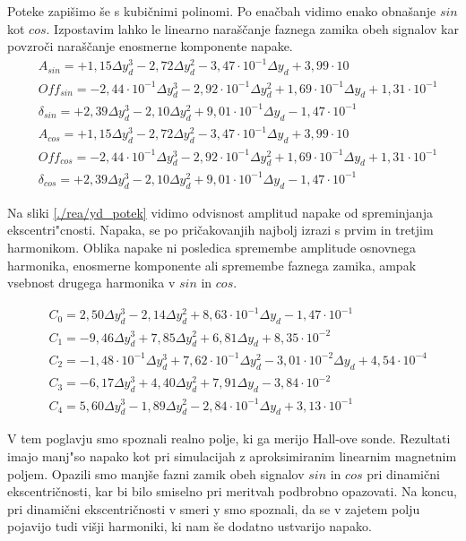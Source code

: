 Poteke zapišimo še s kubičnimi polinomi. Po enačbah vidimo enako obnašanje $sin$ kot $cos$. Izpostavim lahko le linearno naraščanje faznega zamika obeh signalov kar povzroči naraščanje enosmerne komponente napake.
\begin{eqnarray}
&A_{sin} = +1,15\Delta y_d^3-2,72\Delta y_d^2-3,47\cdot 10^{-1}\Delta y_d+3,99\cdot 10\\     
&Off_{sin} = -2,44\cdot 10^{-1}\Delta y_d^3-2,92\cdot 10^{-1}\Delta y_d^2+1,69\cdot 10^{-1}\Delta y_d+1,31\cdot 10^{-1}\\   
&\delta_{sin} = +2,39\Delta y_d^3-2,10\Delta y_d^2+9,01\cdot 10^{-1}\Delta y_d-1,47\cdot 10^{-1}\\
&A_{cos} = +1,15\Delta y_d^3-2,72\Delta y_d^2-3,47\cdot 10^{-1}\Delta y_d+3,99\cdot 10\\     
&Off_{cos} = -2,44\cdot 10^{-1}\Delta y_d^3-2,92\cdot 10^{-1}\Delta y_d^2+1,69\cdot 10^{-1}\Delta y_d+1,31\cdot 10^{-1}\\   
&\delta_{cos} = +2,39\Delta y_d^3-2,10\Delta y_d^2+9,01\cdot 10^{-1}\Delta y_d-1,47\cdot 10^{-1} 
\end{eqnarray}

Na sliki \ref{./rea/yd_potek} vidimo odvisnost amplitud napake od spreminjanja ekscentri"cnosti. Napaka, se po pričakovanjih najbolj izrazi s prvim in tretjim harmonikom. Oblika napake ni posledica spremembe amplitude osnovnega harmonika, enosmerne komponente ali spremembe faznega zamika, ampak vsebnost drugega harmonika v $sin$ in $cos$. 



\begin{eqnarray}
&C_0 =2,50\Delta y_d^{3}-2,14\Delta y_d^{2}+8,63\cdot 10^{-1}\Delta y_d-1,47\cdot 10^{-1} \\                           
&C_1 =-9,46\Delta y_d^{3}+7,85\Delta y_d^{2}+6,81\Delta y_d+8,35\cdot 10^{-2} \\                                       
&C_2 =-1,48\cdot 10^{-1}\Delta y_d^{3}+7,62\cdot 10^{-1}\Delta y_d^{2}-3,01\cdot 10^{-2}\Delta y_d+4,54\cdot 10^{-4} \\
&C_3 =-6,17\Delta y_d^{3}+4,40\Delta y_d^{2}+7,91\Delta y_d-3,84\cdot 10^{-2} \\                                       
&C_4 =5,60\Delta y_d^{3}-1,89\Delta y_d^{2}-2,84\cdot 10^{-1}\Delta y_d+3,13\cdot 10^{-1}       
\end{eqnarray}



V tem poglavju smo spoznali realno polje, ki ga merijo Hall-ove sonde. Rezultati imajo manj"so napako kot pri simulacijah z aproksimiranim linearnim magnetnim poljem. Opazili smo manjše fazni zamik obeh signalov $sin$ in $cos$ pri dinamični ekscentričnosti, kar bi bilo smiselno pri meritvah podbrobno opazovati. Na koncu, pri dinamični ekscentričnosti v smeri y smo spoznali, da se v zajetem polju pojavijo tudi višji harmoniki, ki nam še dodatno ustvarijo napako. 